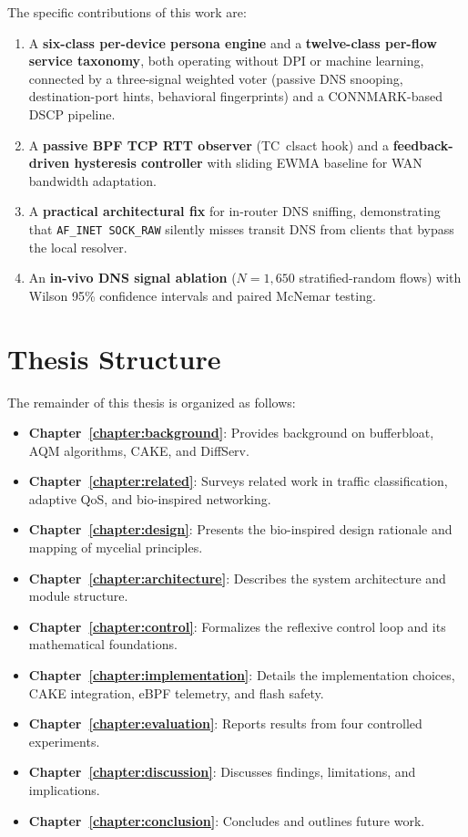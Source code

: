The specific contributions of this work are:

\begin{enumerate}
  \item A \textbf{six-class per-device persona engine} and a \textbf{twelve-class per-flow service taxonomy}, both operating without DPI or machine learning, connected by a three-signal weighted voter (passive DNS snooping, destination-port hints, behavioral fingerprints) and a CONNMARK-based DSCP pipeline.
  \item A \textbf{passive BPF TCP RTT observer} (TC~clsact hook) and a \textbf{feedback-driven hysteresis controller} with sliding EWMA baseline for WAN bandwidth adaptation.
  \item A \textbf{practical architectural fix} for in-router DNS sniffing, demonstrating that \texttt{AF\_INET SOCK\_RAW} silently misses transit DNS from clients that bypass the local resolver.
  \item An \textbf{in-vivo DNS signal ablation} ($N=1{,}650$ stratified-random flows) with Wilson 95\% confidence intervals and paired McNemar testing.
\end{enumerate}

\section{Thesis Structure}

The remainder of this thesis is organized as follows:

\begin{itemize}
  \item \textbf{Chapter~\ref{chapter:background}}: Provides background on bufferbloat, AQM algorithms, CAKE, and DiffServ.
  \item \textbf{Chapter~\ref{chapter:related}}: Surveys related work in traffic classification, adaptive QoS, and bio-inspired networking.
  \item \textbf{Chapter~\ref{chapter:design}}: Presents the bio-inspired design rationale and mapping of mycelial principles.
  \item \textbf{Chapter~\ref{chapter:architecture}}: Describes the system architecture and module structure.
  \item \textbf{Chapter~\ref{chapter:control}}: Formalizes the reflexive control loop and its mathematical foundations.
  \item \textbf{Chapter~\ref{chapter:implementation}}: Details the implementation choices, CAKE integration, eBPF telemetry, and flash safety.
  \item \textbf{Chapter~\ref{chapter:evaluation}}: Reports results from four controlled experiments.
  \item \textbf{Chapter~\ref{chapter:discussion}}: Discusses findings, limitations, and implications.
  \item \textbf{Chapter~\ref{chapter:conclusion}}: Concludes and outlines future work.
\end{itemize}

